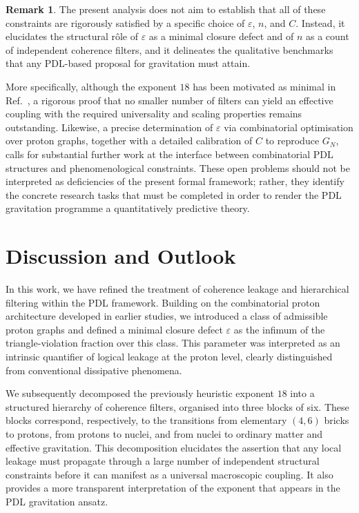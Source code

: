 \documentclass[11pt,a4paper]{article}
\theoremstyle{definition}
\newtheorem{remark}[theorem]{Remark}
\begin{document}
\begin{remark}
The present analysis does not aim to establish that all of these constraints are rigorously satisfied by a specific choice of $\varepsilon$, $n$, and $C$. Instead, it elucidates the structural rôle of $\varepsilon$ as a minimal closure defect and of $n$ as a count of independent coherence filters, and it delineates the qualitative benchmarks that any PDL-based proposal for gravitation must attain.\cite{Exponent_18_PDL_2026,Topological_Reformulation_PDL_2026,PDL_Global_Mapping_2026}

More specifically, although the exponent $18$ has been motivated as minimal in Ref.~\cite{Exponent_18_PDL_2026}, a rigorous proof that no smaller number of filters can yield an effective coupling with the required universality and scaling properties remains outstanding. Likewise, a precise determination of $\varepsilon$ via combinatorial optimisation over proton graphs, together with a detailed calibration of $C$ to reproduce $G_N$, calls for substantial further work at the interface between combinatorial PDL structures and phenomenological constraints.\cite{Effective_Fields_PDL_2026,PDL_Global_Mapping_2026} These open problems should not be interpreted as deficiencies of the present formal framework; rather, they identify the concrete research tasks that must be completed in order to render the PDL gravitation programme a quantitatively predictive theory.
\end{remark}

\section{Discussion and Outlook}
\label{sec:discussion}

In this work, we have refined the treatment of coherence leakage and hierarchical filtering within the PDL framework. Building on the combinatorial proton architecture developed in earlier studies, we introduced a class of admissible proton graphs and defined a minimal closure defect $\varepsilon$ as the infimum of the triangle-violation fraction over this class.\cite{Combinatorial_Proton_v2_2026,PDL_Global_Mapping_2026} This parameter was interpreted as an intrinsic quantifier of logical leakage at the proton level, clearly distinguished from conventional dissipative phenomena.\cite{Topological_Reformulation_PDL_2026}

We subsequently decomposed the previously heuristic exponent $18$ into a structured hierarchy of coherence filters, organised into three blocks of six. These blocks correspond, respectively, to the transitions from elementary $(4,6)$ bricks to protons, from protons to nuclei, and from nuclei to ordinary matter and effective gravitation.\cite{Exponent_18_PDL_2026} This decomposition elucidates the assertion that any local leakage must propagate through a large number of independent structural constraints before it can manifest as a universal macroscopic coupling. It also provides a more transparent interpretation of the exponent that appears in the PDL gravitation ansatz.\cite{PDL_Global_Mapping_2026}
\end{document}
